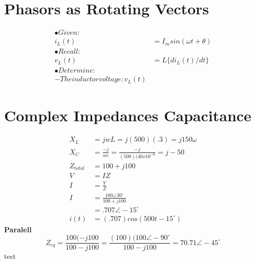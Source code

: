 \documentclass[10pt,a4paper]{article}
\begin{document}
 
\section{Phasors as Rotating Vectors}
\begin{align}
\nonumber
\bullet Given:\\
i_{L}(t)&=I_{m}sin(\omega t + \theta )\\
\nonumber
\bullet Recall:\\
v_{L}(t)&=L\{ di_{L}(t)/dt\}\\
\nonumber
\bullet Determine:\\
\nonumber
-The inductor voltage: v _{L}(t)
\end{align}
\section{Complex Impedances Capacitance}
\begin{align}
X_{L}&=jwL
=j(500)(.3)
=j150\omega\\
X_{C}&=\frac{-j}{wc}
=\frac{-j}{(500)(40x10^{-6}}
=j-50\\
Z_{total}&=100+j100\\
V&=IZ\\
I&=\frac{V}{Z}\\
I&=\frac{100\angle 30^{\circ}}{100+j100}\\
&=.707\angle -15^{\circ}\\
i(t)&=(.707)cos(500t-15^{\circ} )
\end{align}
\textbf{Paralell}
\begin{equation}
Z_{eq}=\frac{100(-j100}{100-j100}=\frac{(100)(100\angle -90^{\circ}}{100-j100}=70.71\angle -45^{\circ}
\end{equation}
\pagebreak
test
\end{document}
